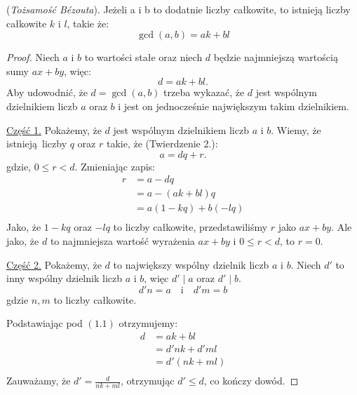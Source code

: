 \begin{theorem}
  (\textit{Tożsamość Bézouta}).
  Jeżeli a i b to dodatnie liczby całkowite,
  to istnieją liczby całkowite $k$ i $l$, takie że:
  \[
    \gcd(a, b) = ak + bl
  \]
\end{theorem}

\begin{proof}
  Niech $a$ i $b$ to wartości stałe
  oraz niech $d$ będzie najmniejszą wartością
  sumy $ax + by$, więc:
  \begin{equation}
    d = ak + bl.
  \end{equation}
  Aby udowodnić, że $d = \gcd(a, b)$ trzeba wykazać,
  że $d$ jest wspólnym dzielnikiem liczb $a$ oraz $b$
  i jest on jednocześnie największym takim dzielnikiem.

  \vspace{1em}

  \noindent\underline{Część 1.}
  Pokażemy, że $d$ jest wspólnym dzielnikiem liczb $a$ i $b$.
  Wiemy, że istnieją liczby $q$ oraz $r$ takie, że (Twierdzenie 2.):
  \[
    a = dq + r
  .\]
  gdzie, $0 \leq r < d$. Zmieniając zapis:
  \begin{align*}
    r &= a - dq \\ %
      &= a - (ak + bl)q \\
      &= a(1 - kq) + b(-lq) \\
  \end{align*}
  Jako, że $1 - kq$ oraz  $-lq$ to liczby całkowite, przedstawiliśmy
  $r$ jako $ax + by$. Ale jako, że $d$ to najmniejsza wartość wyrażenia
  $ax + by$ i $0 \leq r < d$, to $r = 0$.

  \vspace{1em}

  \noindent\underline{Część 2.}
  Pokażemy, że $d$ to największy wspólny dzielnik liczb $a$ i $b$.
  Niech $d'$ to inny wspólny dzielnik liczb $a$ i $b$, więc
  $d' \mid a$ oraz $d' \mid b$.
  \[
    d'n = a \quad \mathrm{i} \quad d'm = b
  \]
  gdzie $n, m$ to liczby całkowite.

  Podstawiając pod  $(1.1)$ otrzymujemy:
  \begin{align*}
    d &= ak + bl \\
      &= d'nk + d'ml \\
      &= d'(nk + ml) \\
  \end{align*}
  Zauważamy, że $d' = \frac{d}{nk + ml}$, otrzymując $d' \leq d$, co kończy dowód.
\end{proof}

